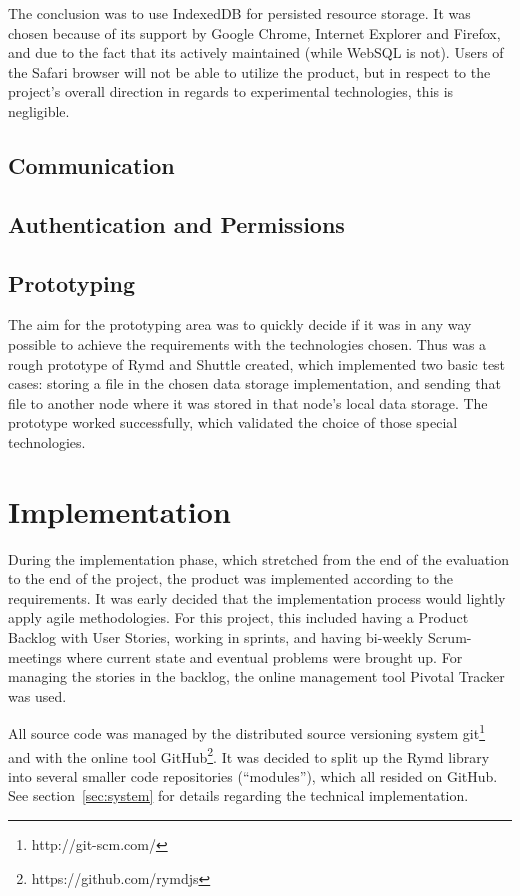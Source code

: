 The conclusion was to use IndexedDB for persisted resource storage. It was chosen because of its support by Google Chrome, Internet Explorer and Firefox, and due to the fact that its actively maintained (while WebSQL is not). Users of the Safari browser will not be able to utilize the product, but in respect to the project's overall direction in regards to experimental technologies, this is negligible.

\subsection{Communication}


\subsection{Authentication and Permissions}


\subsection{Prototyping}

The aim for the prototyping area was to quickly decide if it was in any way possible to achieve the requirements with the technologies chosen. Thus was a rough prototype of Rymd and Shuttle created, which implemented two basic test cases: storing a file in the chosen data storage implementation, and sending that file to another node where it was stored in that node's local data storage. The prototype worked successfully, which validated the choice of those special technologies.

\section{Implementation}

During the implementation phase, which stretched from the end of the evaluation to the end of the project, the product was implemented according to the requirements. It was early decided that the implementation process would lightly apply agile methodologies. For this project, this included having a Product Backlog with User Stories, working in sprints, and having bi-weekly Scrum-meetings where current state and eventual problems were brought up. For managing the stories in the backlog, the online management tool Pivotal Tracker was used.

All source code was managed by the distributed source versioning system git\footnote{http://git-scm.com/} and with the online tool GitHub\footnote{https://github.com/rymdjs}. It was decided to split up the Rymd library into several smaller code repositories (“modules”), which all resided on GitHub. See section~\ref{sec:system} for details regarding the technical implementation.

